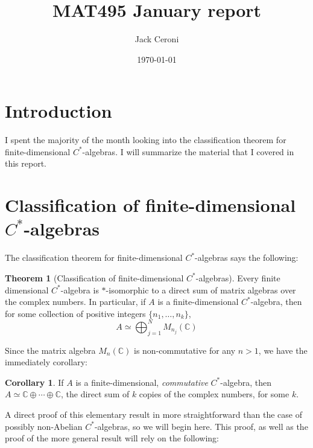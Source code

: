 \documentclass[aps,pra,showpacs,notitlepage,onecolumn,superscriptaddress,nofootinbib]{revtex4-1}
\theoremstyle{definition}
\newtheorem{theorem}{Theorem}[section]
\newtheorem{corollary}{Corollary}[theorem]
\begin{document}
\title{MAT495 January report}

\author{Jack Ceroni}

\date{\today}

\maketitle

\section{Introduction}

\noindent I spent the majority of the month looking into the classification theorem for finite-dimensional $C^{*}$-algebras. I will summarize the material that I covered in this report.

\section{Classification of finite-dimensional $C^{*}$-algebras}

\noindent The classification theorem for finite-dimensional $C^{*}$-algebras says the following:

\begin{theorem}[Classification of finite-dimensional $C^{*}$-algebras]
  Every finite dimensional $C^{*}$-algebra is $*$-isomorphic to a direct sum of matrix algebras over the complex numbers. In particular, if $A$ is a finite-dimensional
  $C^{*}$-algebra, then for some collection of positive integers $\{n_1, \dots, n_k\}$,
  \begin{equation}
    \label{eq:sum}
    A \simeq \displaystyle\bigoplus_{j = 1}^{N} M_{n_j}(\mathbb{C})
    \end{equation}
\end{theorem}

\noindent Since the matrix algebra $M_n(\mathbb{C})$ is non-commutative for any $n > 1$, we have the immediately corollary:

\begin{corollary}
  If $A$ is a finite-dimensional, \emph{commutative} $C^{*}$-algebra, then $A \simeq \mathbb{C} \oplus \cdots \oplus \mathbb{C}$,
  the direct sum of $k$ copies of the complex numbers, for some $k$.
\end{corollary}

\noindent A direct proof of this elementary result in more straightforward than the case of possibly non-Abelian $C^{*}$-algebras, so we will begin here. This proof, as well as the proof
of the more general result will rely on the following:
\end{document}
